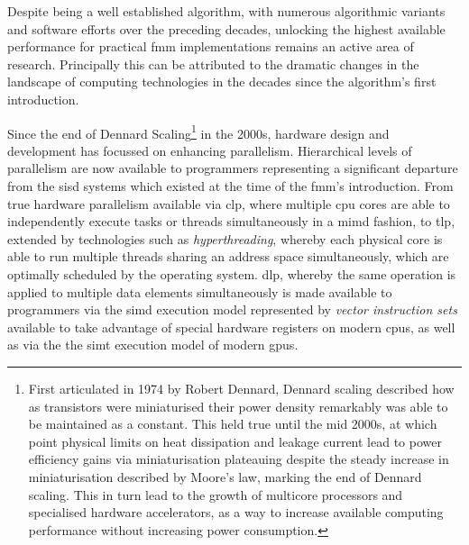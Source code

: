 Despite being a well established algorithm, with numerous algorithmic variants and software efforts over the preceding decades, unlocking the highest available performance for practical \acrshort{fmm} implementations remains an active area of research. Principally this can be attributed to the dramatic changes in the landscape of computing technologies in the decades since the algorithm's first introduction.

Since the end of Dennard Scaling\footnote{First articulated in 1974 by Robert Dennard, Dennard scaling described how as transistors were miniaturised their power density remarkably was able to be maintained as a constant. This held true until the mid 2000s, at which point physical limits on heat dissipation and leakage current lead to power efficiency gains via miniaturisation plateauing despite the steady increase in miniaturisation described by Moore's law, marking the end of Dennard scaling. This in turn lead to the growth of multicore processors and specialised hardware accelerators, as a way to increase available computing performance without increasing power consumption.} in the 2000s, hardware design and development has focussed on enhancing parallelism. Hierarchical levels of parallelism are now available to programmers representing a significant departure from the \acrfull{sisd} systems which existed at the time of the \acrshort{fmm}'s introduction. From true hardware parallelism available via \acrfull{clp}, where multiple \acrfull{cpu} cores are able to independently execute tasks or threads simultaneously in a \acrfull{mimd} fashion, to \acrfull{tlp}, extended by technologies such as \textit{hyperthreading}, whereby each physical core is able to run multiple threads sharing an address space simultaneously, which are optimally scheduled by the operating system. \acrfull{dlp}, whereby the same operation is applied to multiple data elements simultaneously is made available to programmers via the \acrfull{simd} execution model represented by \textit{vector instruction sets} available to take advantage of special hardware registers on modern \glspl{cpu}, as well as via the the \acrfull{simt} execution model of modern \glspl{gpu}.

